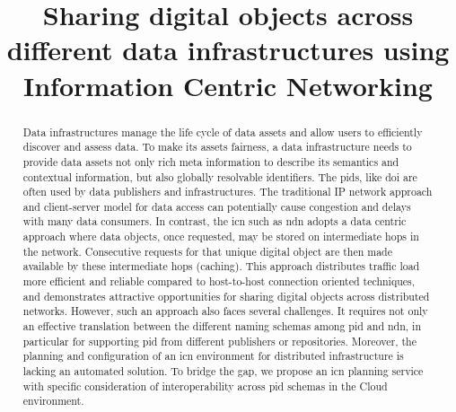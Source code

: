 \documentclass[conference]{IEEEtran}
\begin{document}
\title{Sharing digital objects across different data infrastructures using Information Centric Networking
}

\author{
}

\maketitle

\begin{abstract}
Data infrastructures manage the life cycle of data assets and allow users to efficiently discover and assess data. To make its assets \gls{fairness}, a data infrastructure needs to provide data assets not only rich meta information to describe its semantics and contextual information, but also globally resolvable identifiers. The \glspl{pid}, like \gls{doi} are often used by data publishers and infrastructures. The traditional IP network approach and client-server model for data access can potentially cause congestion and delays with many data consumers. In contrast, the \gls{icn} such as \gls{ndn} adopts a data centric approach where data objects, once requested, may be stored on intermediate hops in the network. Consecutive requests for that unique digital object are then made available by these intermediate hops (caching). This approach distributes traffic load more efficient and reliable compared to host-to-host connection oriented techniques, and demonstrates attractive opportunities for sharing digital objects across distributed networks. However, such an approach also faces several challenges. It requires not only an effective translation between the different naming schemas among \gls{pid} and \gls{ndn}, in particular for supporting \gls{pid} from different publishers or repositories. Moreover, the planning and configuration of an \gls{icn} environment for distributed infrastructure is lacking an automated solution. To bridge the gap, we propose an \gls{icn} planning service with specific consideration of interoperability across \gls{pid} schemas in the Cloud environment.


\end{abstract}
\end{document}
